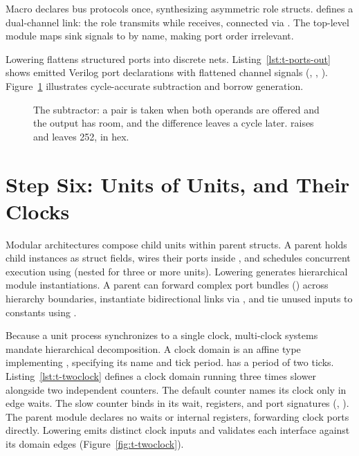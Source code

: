 \documentclass[journal,9pt]{IEEEtran}
\begin{document}
Macro  declares bus protocols once, synthesizing asymmetric
role structs.  defines a dual-channel link: the 
role transmits while  receives, connected via
. The top-level module maps sink signals to  by
name, making port order irrelevant.

Lowering flattens structured ports into discrete nets.
Listing~\ref{lst:t-ports-out} shows emitted Verilog port declarations with
flattened channel signals (, ,
). Figure~\ref{fig:t-ports} illustrates cycle-accurate
subtraction and borrow generation.



\begin{figure}[htbp]
\centering
\resizebox{\columnwidth}{!}{}
\caption{The subtractor: a pair is taken when both operands are
offered and the output has room, and the difference leaves a cycle
later.  raises  and leaves 252,  in hex.}
\label{fig:t-ports}
\end{figure}

\section{Step Six: Units of Units, and Their Clocks}
\label{sec:t-units}

Modular architectures compose child units within parent structs. A parent holds
child instances as struct fields, wires their ports inside , and
schedules concurrent execution using  (nested for three or more
units). Lowering generates hierarchical module instantiations. A parent can
forward complex port bundles () across hierarchy boundaries,
instantiate bidirectional links via , and tie
unused inputs to constants using .

Because a unit process synchronizes to a single clock, multi-clock systems
mandate hierarchical decomposition. A clock domain is an affine type
implementing , specifying its name and tick period.
 has a period of two ticks. Listing~\ref{lst:t-twoclock}
defines a clock domain running three times slower alongside two independent
counters. The default counter names its clock only in edge waits. The slow
counter binds  in its wait, registers, and port signatures
(, ). The parent module declares no
waits or internal registers, forwarding clock ports directly. Lowering emits
distinct clock inputs and validates each interface against its domain edges
(Figure~\ref{fig:t-twoclock}).
\end{document}
